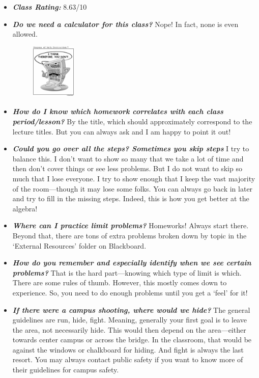 \documentclass[11pt,letterpaper]{article}
\begin{document}
\begin{itemize}
\item {\bfseries\itshape Class Rating:} 8.63/10
\item {\bfseries\itshape Do we need a calculator for this class?} Nope! In fact, none is even allowed. 
	\begin{figure}[H]
	\centering
	\includegraphics[width=0.2\textwidth]{images/calculator.jpg}
	\end{figure}

\item {\bfseries\itshape How do I know which homework correlates with each class period/lesson?} By the title, which should approximately correspond to the lecture titles. But you can always ask and I am happy to point it out!

\item {\bfseries\itshape Could you go over all the steps? Sometimes you skip steps} I try to balance this. I don't want to show so many that we take a lot of time and then don't cover things or see less problems. But I do not want to skip so much that I lose everyone. I try to show enough that I keep the vast majority of the room---though it may lose some folks. You can always go back in later and try to fill in the missing steps. Indeed, this is how you get better at the algebra!

\item {\bfseries\itshape Where can I practice limit problems?} Homeworks! Always start there. Beyond that, there are tons of extra problems broken down by topic in the `External Resources' folder on Blackboard. 

\item {\bfseries\itshape How do you remember and especially identify when we see certain problems?} That is the hard part---knowing which type of limit is which. There are some rules of thumb. However, this mostly comes down to experience. So, you need to do enough problems until you get a `feel' for it! 

\item {\bfseries\itshape If there were a campus shooting, where would we hide?} The general guidelines are run, hide, fight. Meaning, generally your first goal is to leave the area, not necessarily hide. This would then depend on the area---either towards center campus or across the bridge. In the classroom, that would be against the windows or chalkboard for hiding. And fight is always the last resort. You may always contact public safety if you want to know more of their guidelines for campus safety. 


\end{itemize}
\end{document}
